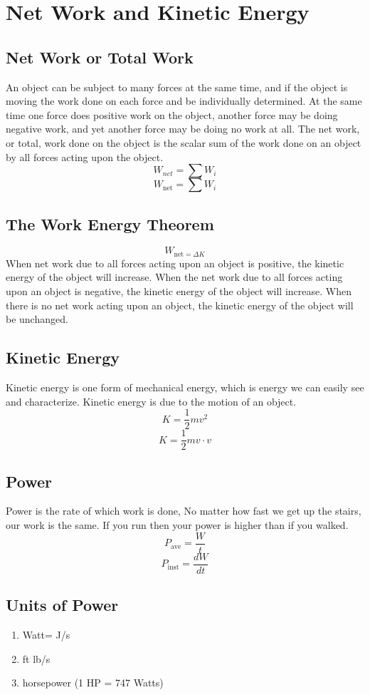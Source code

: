 \section{Net Work and Kinetic Energy}

\subsection{Net Work or Total Work}
An object can be subject to many forces at the same time, and if the object is moving the work done on each force and be individually determined. At the same time one force does positive work on the object, another force may be doing negative work, and yet another force may be doing no work at all. The net work, or total, work done on the object is the scalar sum of the work done on an object by all forces acting upon the object.
\[W_{net}=\sum W_i\]
\[W_{\text{net}}=\sum W_i\]


\subsection{The Work Energy Theorem}
\[W_{\text{net}=\Delta K}\]
When net work due to all forces acting upon an object is positive, the kinetic energy of the object will increase. When the net work due to all forces acting upon an object is negative, the kinetic energy of the object will increase. When there is no net work acting upon an object, the kinetic energy of the object will be unchanged. 

\subsection{Kinetic Energy}
Kinetic energy is one form of mechanical energy, which is energy we can easily see and characterize. Kinetic energy is due to the motion of an object.
\[K=\frac{1}{2}mv^2\]
\[K=\frac{1}{2}m v\cdot v\]

\subsection{Power}
Power is the rate of which work is done, No matter how fast we get up the stairs, our work is the same. If you run then your power is higher than if you walked.
\[P_{\text{ave}}=\frac{W}{t}\]
\[P_{\text{inst}} = \frac{dW}{dt}\]
\[\]

\subsection{Units of Power}
\begin{enumerate}
	\item Watt= J/s
	\item ft lb/s
	\item horsepower (1 HP = 747 Watts)
\end{enumerate}